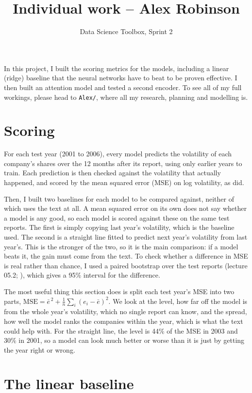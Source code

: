 \documentclass[11pt,a4paper]{article}
\title{Individual work -- Alex Robinson}
\author{Data Science Toolbox, Sprint 2}
\date{}
\begin{document}
\maketitle

In this project, I built the scoring metrics for the models, including a linear (ridge) baseline that the neural
networks have to beat to be proven effective. I then built an attention model and tested a second encoder. To see all
of my full workings, please head to \texttt{Alex/}, where all my research, planning and modelling is.

\section{Scoring}

For each test year (2001 to 2006), every model predicts the volatility of each company's shares over the 12 months
after its report, using only earlier years to train. Each prediction is then checked against the volatility that
actually happened, and scored by the mean squared error (MSE) on log volatility, as \citet{kogan2009} did.

Then, I built two baselines for each model to be compared against, neither of which uses the text at all. A mean
squared error on its own does not say whether a model is any good, so each model is scored against these on the same
test reports. The first is simply copying last year's volatility, which is the baseline \citet{kogan2009} used. The
second is a straight line fitted to predict next year's volatility from last year's. This is the stronger of the two,
so it is the main comparison: if a model beats it, the gain must come from the text. To check whether a difference in
MSE is real rather than chance, I used a paired bootstrap over the test reports (lecture 05.2; \citealp{dst052}),
which gives a 95\% interval for the difference.

The most useful thing this section does is split each test year's MSE into two parts,
$\text{MSE} = \bar e^{\,2} + \tfrac1n\sum_i (e_i - \bar e)^2$. We look at the level, how far off the model is from the
whole year's volatility, which no single report can know, and the spread, how well the model ranks the companies within
the year, which is what the text could help with. For the straight line, the level is 44\% of the MSE in 2003 and 30\%
in 2001, so a model can look much better or worse than it is just by getting the year right or wrong.

\section{The linear baseline}
\end{document}

